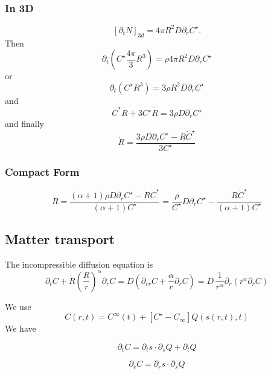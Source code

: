 \documentclass[11pt]{revtex4}
\begin{document}
\subsubsection{In 3D}
\begin{equation}
	\left[\partial_t N\right]_{3d} =  4\pi R^2 D \partial_r C^\star.
\end{equation}
Then
\begin{equation}
	\partial_t\left( C^\star \dfrac{4\pi}{3} R^3 \right) = \rho   4\pi R^2 D \partial_r C^\star
\end{equation}
or
\begin{equation}
	\partial_t\left( C^\star R^3\right) = 3\rho R^2 D \partial_r C^\star
\end{equation}
and
\begin{equation}
	\dot{C}^\star R + 3 C^\star \dot{R}  = 3\rho  D \partial_r C^\star
\end{equation}
and finally
\begin{equation}
	\dot{R} = \dfrac{3\rho  D \partial_r C^\star - R\dot{C}^\star}{3C^\star}
\end{equation}

\subsubsection{Compact Form}
\begin{equation}
	\dot{R} = \dfrac{(\alpha+1)\rho  D \partial_r C^\star - R\dot{C}^\star}{(\alpha+1)C^\star} = \dfrac{\rho}{C^\star} D\partial_rC^\star - \dfrac{R\dot{C}^\star}{\left(\alpha+1\right)C^\star}
\end{equation}

\subsection{Matter transport}
The incompressible diffusion equation is
\begin{equation}
	\partial_t C + \dot{R} \left(\dfrac{R}{r}\right)^\alpha  \partial_r C = D \left( \partial_{rr} C + \dfrac{\alpha}{r} \partial_r C \right) = D \, \dfrac{1}{r^\alpha} \partial_r \left(r^\alpha\partial_r C\right)
\end{equation}

We use
\begin{equation}
	C(r,t) = C^\infty(t) + \left[C^\star-C_\infty\right] Q(s(r,t),t)
\end{equation}
We have

\begin{equation}
	\partial_t C = \partial_t s \cdot  \partial_s Q + \partial_t Q
\end{equation}

\begin{equation}
	\partial_r C = \partial_r s \cdot \partial_s Q
\end{equation}
\end{document}
